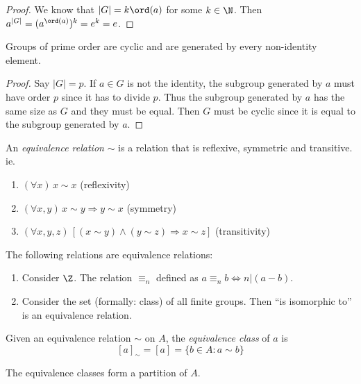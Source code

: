 \documentclass[a4paper]{article}
\begin{document}
\begin{proof}
  We know that $|G| = k\ord(a)$ for some $k\in \N$. Then $a^{|G|} = (a^{\ord(a)})^k = e^k = e$.
\end{proof}

\begin{cor}
  Groups of prime order are cyclic and are generated by every non-identity element.
\end{cor}

\begin{proof}
  Say $|G| = p$. If $a\in G$ is not the identity, the subgroup generated by $a$ must have order $p$ since it has to divide $p$. Thus the subgroup generated by $a$ has the same size as $G$ and they must be equal. Then $G$ must be cyclic since it is equal to the subgroup generated by $a$.
\end{proof}

\begin{defi}
  An \emph{equivalence relation} $\sim$ is a relation that is reflexive, symmetric and transitive. ie.
  \begin{enumerate}
    \item $(\forall x)\,x\sim x$ \hfill (reflexivity)
    \item $(\forall x, y)\,x\sim y \Rightarrow y\sim x$ \hfill (symmetry)
    \item $(\forall x, y, z)\,[(x\sim y) \wedge (y\sim z)\Rightarrow x\sim z]$ \hfill (transitivity)
  \end{enumerate}
\end{defi}

\begin{eg}
  The following relations are equivalence relations:
  \begin{enumerate}
    \item Consider $\Z$. The relation $\equiv_n$ defined as $a\equiv_n b \Leftrightarrow n | (a - b)$.
    \item Consider the set (formally: class) of all finite groups. Then ``is isomorphic to'' is an equivalence relation.
  \end{enumerate}
\end{eg}

\begin{defi}
  Given an equivalence relation $\sim$ on $A$, the \emph{equivalence class} of $a$ is
  \[
    [a]_{\sim} = [a] = \{b\in A: a\sim b\}
  \]
\end{defi}

\begin{prop}
  The equivalence classes form a partition of $A$.
\end{prop}
\end{document}
